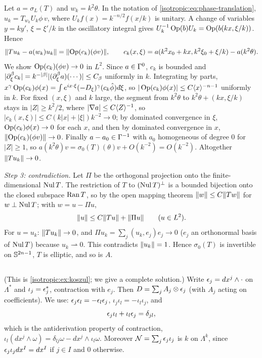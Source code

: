 Let $a=\sigma_L(T)$ and $w_k=k^2\theta$. In the notation of \eqref{isotropic:eq:phase-translation},
$u_k=T_{w_k}U_k\phi\,v$, where $U_kf(x)=k^{-n/2}f(x/k)$ is unitary. A change of variables $y=ky'$,
$\xi=\xi'/k$ in the oscillatory integral gives $U_k^{-1}\operatorname{Op}(b)U_k=\operatorname{Op}(b(kx,\xi/k))$. Hence
\begin{equation*}
  \lVert Tu_k-a(w_k)u_k\rVert=\lVert \operatorname{Op}(c_k)(\phi v)\rVert,\qquad c_k(x,\xi)=a(k^2x_0+kx,k^2\xi_0+\xi/k)-a(k^2\theta).
\end{equation*}
We show $\operatorname{Op}(c_k)(\phi v)\to0$ in $L^2$. Since $a\in\Gamma^{0}$, $c_k$ is bounded and
$|\partial_\xi^\beta c_k|=k^{-|\beta|}|(\partial_\xi^\beta a)(\cdots)|\le C_\beta$ uniformly in $k$. Integrating by
parts, $x^\gamma\Op(c_k)\phi(x)=\int e^{ix\cdot\xi}(-D_\xi)^\gamma(c_k\hat\phi)\,\dbar\xi$, so
$|\operatorname{Op}(c_k)\phi(x)|\le C\langle x\rangle^{-n-1}$ uniformly in $k$. For fixed $(x,\xi)$ and $k$ large, the segment
from $k^2\theta$ to $k^2\theta+(kx,\xi/k)$ stays in $|Z|\ge k^2/2$, where $|\nabla a|\le C\langle Z\rangle^{-1}$, so
$|c_k(x,\xi)|\le C(k|x|+|\xi|)k^{-2}\to0$; by dominated convergence in $\xi$,
$\operatorname{Op}(c_k)\phi(x)\to0$ for each $x$, and then by dominated convergence in $x$,
$\lVert \operatorname{Op}(c_k)(\phi v)\rVert\to0$. Finally $a-a_0\in\Gamma^{-1}$ with $a_0$ homogeneous of degree $0$ for
$|Z|\ge1$, so $a(k^2\theta)v=\sigma_0(T)(\theta)v+O(k^{-2})=O(k^{-2})$. Altogether $\lVert Tu_k\rVert\to0$.

\emph{Step 3: contradiction.} Let $\Pi$ be the orthogonal projection onto the finite-dimensional
$\operatorname{Nul} T$. The restriction of $T$ to $(\operatorname{Nul} T)^\perp$ is a bounded bijection onto the closed subspace
$\operatorname{Ran} T$, so by the open mapping theorem $\lVert w\rVert\le C\lVert Tw\rVert$ for $w\perp\operatorname{Nul} T$; with
$w=u-\Pi u$,
\begin{equation*}
  \lVert u\rVert\le C\lVert Tu\rVert+\lVert \Pi u\rVert\qquad(u\in L^2).
\end{equation*}
For $u=u_k$: $\lVert Tu_k\rVert\to0$, and $\Pi u_k=\sum_j(u_k,e_j)e_j\to0$ ($e_j$ an orthonormal basis of
$\operatorname{Nul} T$) because $u_k\rightharpoonup0$. This contradicts $\lVert u_k\rVert=1$. Hence $\sigma_0(T)$ is invertible on
$\mathbb{S}^{2n-1}$, $T$ is elliptic, and so is $A$.

\subsection*{}
(This is \cref{isotropic:ex:koszul}; we give a complete solution.) Write $\epsilon_j=dx^j\wedge\cdot$ on
$\Lambda^*$ and $\iota_j=\epsilon_j^*$, contraction with $e_j$. Then $D=\sum_jA_j\otimes\epsilon_j$ (with $A_j$ acting on
coefficients). We use: $\epsilon_j\epsilon_l=-\epsilon_l\epsilon_j$, $\iota_j\iota_l=-\iota_l\iota_j$, and
\begin{equation}\label{soldeterminants:eq:car}
  \epsilon_j\iota_l+\iota_l\epsilon_j=\delta_{jl},
\end{equation}
which is the antiderivation property of contraction,
$\iota_l(dx^j\wedge\omega)=\delta_{lj}\omega-dx^j\wedge\iota_l\omega$. Moreover $\mathcal N=\sum_j\epsilon_j\iota_j$ is
$k$ on $\Lambda^k$, since $\epsilon_j\iota_jdx^I=dx^I$ if $j\in I$ and $0$ otherwise.


